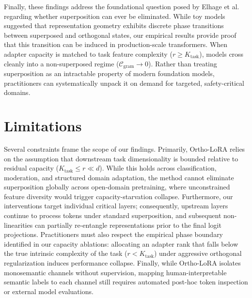 \documentclass[10pt,twocolumn,letterpaper]{article}
\begin{document}
Finally, these findings address the foundational question posed by Elhage et al.~\cite{elhage2022toy} regarding whether superposition can ever be eliminated. While toy models suggested that representation geometry exhibits discrete phase transitions between superposed and orthogonal states, our empirical results provide proof that this transition can be induced in production-scale transformers. When adapter capacity is matched to task feature complexity ($r \ge K_{\text{task}}$), models cross cleanly into a non-superposed regime ($\mathcal{C}_{\text{gram}} \to 0$). Rather than treating superposition as an intractable property of modern foundation models, practitioners can systematically unpack it on demand for targeted, safety-critical domains.

\section{Limitations}
\label{sec:limitations}

Several constraints frame the scope of our findings. Primarily, Ortho-LoRA relies on the assumption that downstream task dimensionality is bounded relative to residual capacity ($K_{\text{task}} \le r \ll d$). While this holds across classification, moderation, and structured domain adaptation, the method cannot eliminate superposition globally across open-domain pretraining, where unconstrained feature diversity would trigger capacity-starvation collapse. Furthermore, our interventions target individual critical layers; consequently, upstream layers continue to process tokens under standard superposition, and subsequent non-linearities can partially re-entangle representations prior to the final logit projections. Practitioners must also respect the empirical phase boundary identified in our capacity ablations: allocating an adapter rank that falls below the true intrinsic complexity of the task ($r < K_{\text{task}}$) under aggressive orthogonal regularization induces performance collapse. Finally, while Ortho-LoRA isolates monosemantic channels without supervision, mapping human-interpretable semantic labels to each channel still requires automated post-hoc token inspection or external model evaluations.

\end{document}
